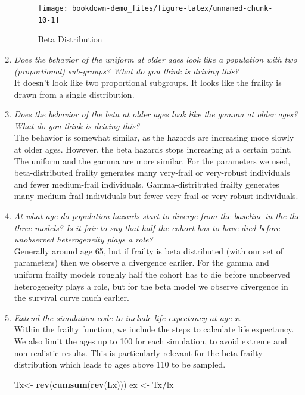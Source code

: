 \documentclass[]{book}
\newenvironment{Shaded}{\begin{snugshade}}{\end{snugshade}}
\newcommand{\KeywordTok}[1]{\textcolor[rgb]{0.13,0.29,0.53}{\textbf{#1}}}
\newcommand{\NormalTok}[1]{#1}
\newcommand{\OperatorTok}[1]{\textcolor[rgb]{0.81,0.36,0.00}{\textbf{#1}}}
\newcommand{\StringTok}[1]{\textcolor[rgb]{0.31,0.60,0.02}{#1}}
\begin{document}
\begin{enumerate}
  \begin{figure}
   \texttt{[image: bookdown-demo\_files/figure-latex/unnamed-chunk-10-1]} \caption{Beta Distribution}\label{fig:unnamed-chunk-10}
   \end{figure}
\item
  \emph{Does the behavior of the uniform at older ages look like a population with two (proportional) sub-groups? What do you think is driving this?}\\
  It doesn't look like two proportional subgroups. It looks like the frailty is drawn from a single distribution.\\
\item
  \emph{Does the behavior of the beta at older ages look like the gamma at older ages? What do you think is driving this?}\\
  The behavior is somewhat similar, as the hazards are increasing more slowly at older ages. However, the beta hazards stops increasing at a certain point. The uniform and the gamma are more similar. For the parameters we used, beta-distributed frailty generates many very-frail or very-robust individuals and fewer medium-frail individuals. Gamma-distributed frailty generates many medium-frail individuals but fewer very-frail or very-robust individuals.\\
\item
  \emph{At what age do population hazards start to diverge from the baseline in the the three models? Is it fair to say that half the cohort has to have died before unobserved heterogeneity plays a role?}\\
  Generally around age 65, but if frailty is beta distributed (with our set of parameters) then we observe a divergence earlier. For the gamma and uniform frailty models roughly half the cohort has to die before unobserved heterogeneity plays a role, but for the beta model we observe divergence in the survival curve much earlier.\\
\item
  \emph{Extend the simulation code to include life expectancy at age x.}\\
  Within the frailty function, we include the steps to calculate life expectancy. We also limit the ages up to 100 for each simulation, to avoid extreme and non-realistic results. This is particularly relevant for the beta frailty distribution which leads to ages above 110 to be sampled.

\begin{Shaded}
\begin{Highlighting}[]
\NormalTok{Tx<-}\StringTok{ }\KeywordTok{rev}\NormalTok{(}\KeywordTok{cumsum}\NormalTok{(}\KeywordTok{rev}\NormalTok{(Lx)))}
\NormalTok{ex <-}\StringTok{ }\NormalTok{Tx}\OperatorTok{/}\NormalTok{lx}
\end{Highlighting}
\end{Shaded}


\end{enumerate}
\end{document}
